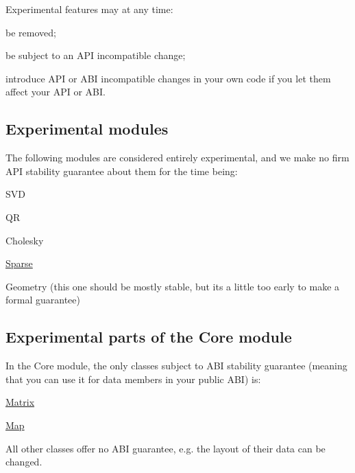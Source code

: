 Experimental features may at any time\+: \begin{DoxyItemize}
\item be removed; \item be subject to an A\+PI incompatible change; \item introduce A\+PI or A\+BI incompatible changes in your own code if you let them affect your A\+PI or A\+BI.\end{DoxyItemize}
\hypertarget{_experimental_Experimental_modules}{}\subsection{Experimental modules}\label{_experimental_Experimental_modules}
The following modules are considered entirely experimental, and we make no firm A\+PI stability guarantee about them for the time being\+: \begin{DoxyItemize}
\item S\+VD \item QR \item Cholesky \item \hyperlink{struct_eigen_1_1_sparse}{Sparse} \item Geometry (this one should be mostly stable, but it\textquotesingle{}s a little too early to make a formal guarantee)\end{DoxyItemize}
\hypertarget{_experimental_Experimental_core}{}\subsection{Experimental parts of the Core module}\label{_experimental_Experimental_core}
In the Core module, the only classes subject to A\+BI stability guarantee (meaning that you can use it for data members in your public A\+BI) is\+: \begin{DoxyItemize}
\item \hyperlink{group___core___module_class_eigen_1_1_matrix}{Matrix} \item \hyperlink{group___core___module_class_eigen_1_1_map}{Map}\end{DoxyItemize}
All other classes offer no A\+BI guarantee, e.\+g. the layout of their data can be changed.

